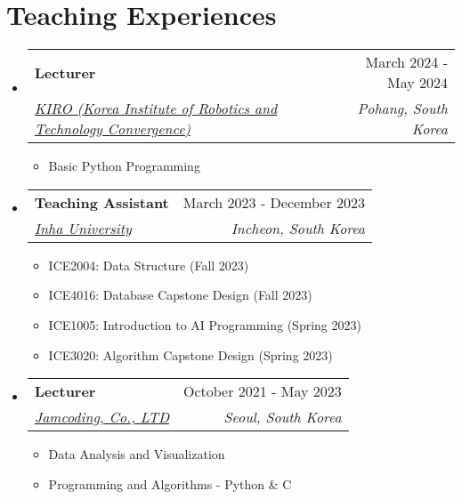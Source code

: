 \documentclass[letterpaper,11pt]{article}
\makeatletter
\newcommand{\resumeSubheading}[4]{
  \vspace{-1pt}\item
    \begin{tabular*}{0.97\textwidth}{l@{\extracolsep{\fill}}r}
      #1 & #2 \\
      \textit{\small#3} & \textit{\small #4} \\
    \end{tabular*}\vspace{-5pt}
}
\makeatother
\begin{document}
    \section{Teaching Experiences}
    \begin{itemize}[leftmargin=*,label=]

        \resumeSubheading
        {\textbf{Lecturer}}{March 2024 - May 2024}
            {\href{https://www.kiro.re.kr/eng/default.asp}{KIRO (Korea Institute of Robotics and Technology Convergence)}}{Pohang, South Korea}
            \begin{itemize}[label=\bullet]
                \item{Basic Python Programming}
            \end{itemize}
            
        \resumeSubheading
        {\textbf{Teaching Assistant}}{March 2023 - December 2023}
            {\href{https://eng.inha.ac.kr/eng/index.do}{Inha University}}{Incheon, South Korea}
            \begin{itemize}[label=\bullet]
                \item{ICE2004: Data Structure (Fall 2023)}
                \item{ICE4016: Database Capstone Design (Fall 2023)}
                \item{ICE1005: Introduction to AI Programming (Spring 2023)}
                \item{ICE3020: Algorithm Capstone Design (Spring 2023)}
            \end{itemize}

        \resumeSubheading
        {\textbf{Lecturer}}{October 2021 - May 2023}
            {\href{https://jamcoding.co.kr/}{Jamcoding, Co., LTD}}{Seoul, South Korea}
            \begin{itemize}[label=\bullet]
                \item{Data Analysis and Visualization}
                \item{Programming and Algorithms - Python \& C}
            \end{itemize}
            
    \end{itemize}
    
\end{document}
